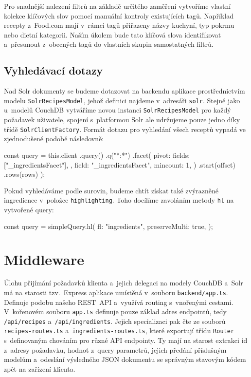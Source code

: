 Pro snadnější nalezení filtrů na základě určitého zaměření vytvoříme vlastní kolekce klíčových slov pomocí manuální kontroly existujících tagů. Například recepty z~Food.com mají v~rámci tagů přiřazeny názvy kuchyní, typ pokrmu nebo dietní kategorii. Naším úkolem bude tato klíčová slova identifikovat a~přesunout z~obecných tagů do vlastních skupin samostatných filtrů.

\subsection{Vyhledávací dotazy}

Nad Solr dokumenty se budeme dotazovat na backendu aplikace prostřednictvím modelu \texttt{SolrRecipesModel}, jehož definici najdeme v~adresáři \texttt{solr}. Stejně jako u~modelů CouchDB vytváříme novou instanci \texttt{SolrRecipesModel} pro každý požadavek uživatele, spojení s~platformou Solr ale udržujeme pouze jedno díky třídě \texttt{SolrClientFactory}. Formát dotazu pro vyhledání všech receptů vypadá ve zjednodušené podobě následovně:
\begingroup
\samepage
\begin{code}
const query = this.client
  .query()
  .q("*:*")
  .facet({
    pivot: {
      fields: ["_ingredientsFacet"],
    },
    field: "_ingredientsFacet",
    mincount: 1,
  })
  .start(offset)
  .rows(rows)
);
\end{code}
\endgroup

Pokud vyhledáváme podle surovin, budeme chtít získat také zvýrazněné ingredience v~položce \texttt{highlighting}. Toho docílíme zavoláním metody \texttt{hl} na vytvořené query:
\begingroup
\samepage
\begin{code}
const query = simpleQuery.hl({
  fl: "ingredients",
  preserveMulti: true,
});
\end{code}
\endgroup

\section{Middleware}

Úlohu přijímání požadavků klienta a~jejich delegaci na modely CouchDB a~Solr má na starosti tzv.~Express aplikace umístěná v~souboru \texttt{backend/app.ts}. Definuje podobu našeho REST~API a~využívá routing s~vnořenými cestami. V~kořenovém souboru \texttt{app.ts} definuje pouze základ adres endpointů, tedy \texttt{/api/recipes} a~\texttt{/api/ingredients}. Jejich specializaci pak čte ze souborů \texttt{recipes-routes.ts} a~\texttt{ingredients-routes.ts}, které exportují třídu \texttt{Router} s~definovaným chováním pro různé API endpointy. Ty mají na starost extrakci id z~adresy požadavku, hodnot z~query parametrů, jejich předání příslušným modelům a~odeslání výsledného JSON dokumentu se správným stavovým kódem zpět na zařízení klienta.

